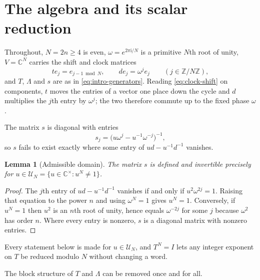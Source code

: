\documentclass[11pt,reqno]{amsart}
\theoremstyle{plain}
\newtheorem{lemma}[theorem]{Lemma}
\theoremstyle{definition}
\theoremstyle{remark}
\numberwithin{equation}{section}
\begin{document}
\section{The algebra and its scalar reduction}
\label{sec:algebra}

Throughout, $N=2n\ge4$ is even, $\omega=e^{2\pi\mathrm{i}/N}$ is a primitive
$N$th root of unity, $V=\mathbb{C}^{N}$ carries the shift and clock matrices
\begin{equation}
  te_{j}=e_{j-1\bmod N},
  \qquad
  de_{j}=\omega^{j}e_{j}
  \qquad (j\in\mathbb{Z}/N\mathbb{Z}),
  \label{eq:clock-shift}
\end{equation}
and $T$, $\Lambda$ and $s$ are as in \cref{eq:intro-generators}. Reading
\cref{eq:clock-shift} on components, $t$ moves the entries of a vector one
place down the cycle and $d$ multiplies the $j$th entry by $\omega^{j}$; the
two therefore commute up to the fixed phase $\omega$.

The matrix $s$ is diagonal with entries
\begin{equation}
  s_{j}=\bigl(u\omega^{j}-u^{-1}\omega^{-j}\bigr)^{-1},
  \label{eq:sj}
\end{equation}
so $s$ fails to exist exactly where some entry of $ud-u^{-1}d^{-1}$ vanishes.

\begin{lemma}[Admissible domain]
\label{lem:domain}
The matrix $s$ is defined and invertible precisely for
$u\in\mathcal{U}_{N}=\{u\in\mathbb{C}^{\times}:u^{N}\ne1\}$.
\end{lemma}

\begin{proof}
The $j$th entry of $ud-u^{-1}d^{-1}$ vanishes if and only if
$u^{2}\omega^{2j}=1$. Raising that equation to the power $n$ and using
$\omega^{N}=1$ gives $u^{N}=1$. Conversely, if $u^{N}=1$ then $u^{2}$ is an
$n$th root of unity, hence equals $\omega^{-2j}$ for some $j$ because
$\omega^{2}$ has order $n$. Where every entry is nonzero, $s$ is a diagonal
matrix with nonzero entries.
\end{proof}

Every statement below is made for $u\in\mathcal{U}_{N}$, and $T^{N}=I$ lets any
integer exponent on $T$ be reduced modulo $N$ without changing a word.

The block structure of $T$ and $\Lambda$ can be removed once and for all.
\end{document}
